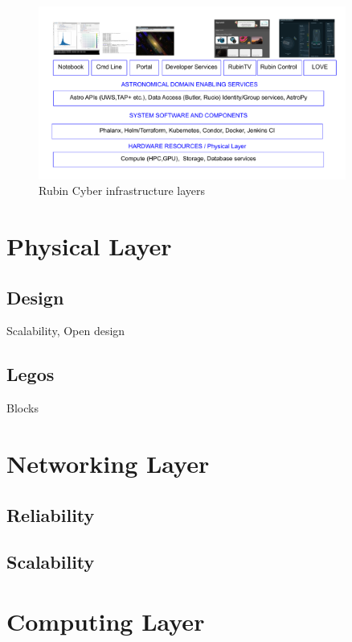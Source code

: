 \newpage

\begin{figure}
\begin{centering}
\includegraphics[width=0.9\textwidth]{images/CI-Rubin}
	\caption{Rubin Cyber infrastructure layers
\label{fig:ci-rubin}}
\end{centering}
\end{figure}

\section{Physical Layer} \label{sec:physical}

\subsection{Design}
Scalability, Open design

\subsection{Legos}
Blocks

\section{Networking Layer} \label{sec:networking}

\subsection{Reliability}

\subsection{Scalability}

\section{Computing Layer} \label{sec:computing}

